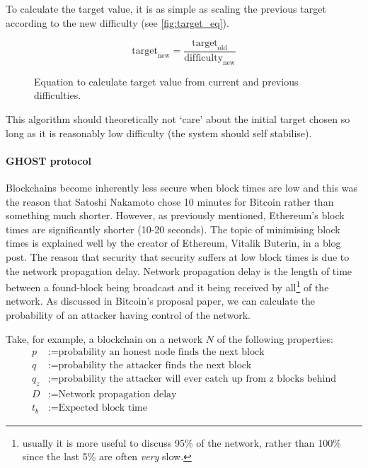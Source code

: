 \documentclass{article}
\begin{document}
To calculate the target value, it is as simple as scaling the previous target according to the new difficulty (see \autoref{fig:target_eq}).
\begin{figure}[h]
    \[\textrm{target}_{\textrm{new}} = \frac{\textrm{target}_{\textrm{old}}} {\textrm{difficulty}_{\textrm{new}}}\]
    \caption{Equation to calculate target value from current and previous difficulties.}
    \label{fig:target_eq}
\end{figure}
This algorithm should theoretically not `care' about the initial target chosen so long as it is reasonably low difficulty (the system should self stabilise). 





\paragraph{GHOST protocol}
Blockchains become inherently less secure when block times are low and this was the reason that Satoshi Nakamoto chose 10 minutes for Bitcoin rather than something much shorter. However, as previously mentioned, Ethereum's block times are significantly shorter (10-20 seconds). The topic of minimising block times is explained well by the creator of Ethereum, Vitalik Buterin, in a blog post\cite{toward_twelve_s_bt}. The reason that security that security suffers at low block times is due to the network propagation delay. Network propagation delay is the length of time between a found-block being broadcast and it being received by all\footnote{usually it is more useful to discuss 95\% of the network, rather than 100\% since the last 5\% are often \emph{very} slow.} of the network. As discussed in Bitcoin's proposal paper\cite{bitcoin_paper}, we can calculate the probability of an attacker having control of the network.

Take, for example, a blockchain on a network $N$ of the following properties:
\begin{align*}
    p &:= \textrm{probability an honest node finds the next block} \\
    q &:= \textrm{probability the attacker finds the next block} \\
    q_{z} &:= \textrm{probability the attacker will ever catch up from z blocks behind} \\
    D &:= \textrm{Network propagation delay} \\
    t_b &:= \textrm{Expected block time}
\end{align*}
\end{document}
